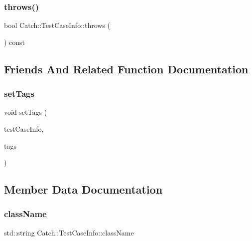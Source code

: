 \mbox{\label{struct_catch_1_1_test_case_info_afc70d4379a2070cc22b693ffe3932c1a}} 
\subsubsection{\texorpdfstring{throws()}{throws()}}
{\footnotesize\ttfamily bool Catch\+::\+Test\+Case\+Info\+::throws (\begin{DoxyParamCaption}{ }\end{DoxyParamCaption}) const}



\subsection{Friends And Related Function Documentation}
\mbox{\label{struct_catch_1_1_test_case_info_a0fe44abaf18ae7c26f98a9fc2b08679c}} 
\subsubsection{\texorpdfstring{setTags}{setTags}}
{\footnotesize\ttfamily void set\+Tags (\begin{DoxyParamCaption}\item[{\mbox{\hyperlink{struct_catch_1_1_test_case_info}{Test\+Case\+Info}} \&}]{test\+Case\+Info,  }\item[{std\+::vector$<$ std\+::string $>$}]{tags }\end{DoxyParamCaption})\hspace{0.3cm}{\ttfamily [friend]}}



\subsection{Member Data Documentation}
\mbox{\label{struct_catch_1_1_test_case_info_a1a5e0825132a38d091defdebbf2f8ce9}} 
\subsubsection{\texorpdfstring{className}{className}}
{\footnotesize\ttfamily std\+::string Catch\+::\+Test\+Case\+Info\+::class\+Name}

